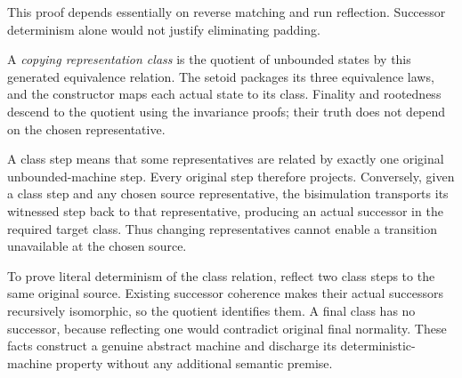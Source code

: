 This proof depends essentially on reverse matching and run reflection.
Successor determinism alone would not justify eliminating padding.



A \emph{copying representation class} is the quotient of unbounded states
by this generated equivalence relation. The setoid packages its three
equivalence laws, and the constructor maps each actual state to its class.
Finality and rootedness descend to the quotient using the invariance proofs;
their truth does not depend on the chosen representative.






A class step means that some representatives are related by exactly one
original unbounded-machine step. Every original step therefore projects.
Conversely, given a class step and any chosen source representative, the
bisimulation transports its witnessed step back to that representative,
producing an actual successor in the required target class. Thus changing
representatives cannot enable a transition unavailable at the chosen source.




To prove literal determinism of the class relation, reflect two class
steps to the same original source. Existing successor coherence makes their
actual successors recursively isomorphic, so the quotient identifies them.
A final class has no successor, because reflecting one would contradict
original final normality. These facts construct a genuine abstract machine
and discharge its deterministic-machine property without any additional
semantic premise.

